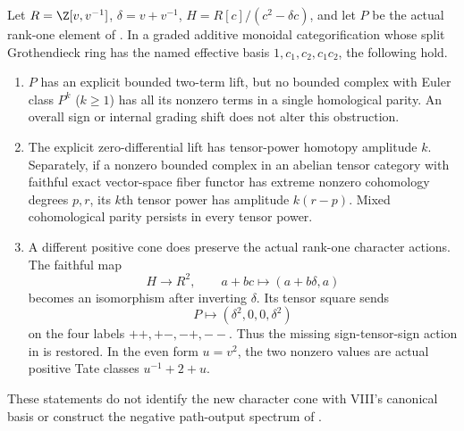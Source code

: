 \begin{finding}\label{f:derived}
Let $R=\Z[v,v^{-1}]$, $\delta=v+v^{-1}$,
$H=R[c]/(c^2-\delta c)$, and let $P$ be the actual rank-one element
of . In a graded additive monoidal categorification whose
split Grothendieck ring has the named effective basis
$1,c_1,c_2,c_1c_2$, the following hold.
\begin{enumerate}
\item $P$ has an explicit bounded two-term lift, but no bounded complex
with Euler class $P^k$ ($k\ge1$) has all its nonzero terms in a single
homological parity. An overall sign or internal grading shift does not
alter this obstruction.
\item The explicit zero-differential lift has tensor-power homotopy
amplitude $k$. Separately, if a nonzero bounded complex in an abelian tensor category
with faithful exact vector-space fiber functor has extreme nonzero
cohomology degrees $p,r$, its $k$th tensor power has amplitude $k(r-p)$.
Mixed cohomological parity persists in every tensor power.
\item A different positive cone does preserve the actual rank-one
character actions. The faithful map
\[
 H\longrightarrow R^2,\qquad a+bc\longmapsto(a+b\delta,a)
\]
becomes an isomorphism after inverting $\delta$. Its tensor square sends
\[
 P\longmapsto(\delta^2,0,0,\delta^2)
\]
on the four labels $++,+-,-+,--$. Thus the missing sign-tensor-sign
action in  is restored. In the even form $u=v^2$, the two
nonzero values are actual positive Tate classes
$u^{-1}+2+u$.
\end{enumerate}
These statements do not identify the new character cone with VIII's
canonical basis or construct the negative path-output spectrum of
.
\end{finding}
